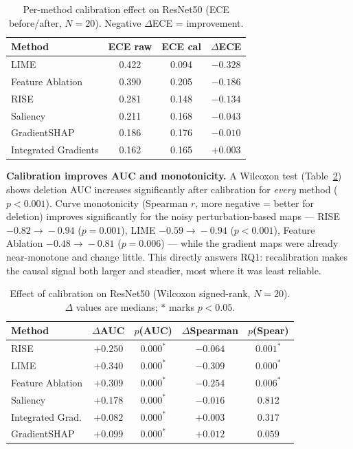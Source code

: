 \documentclass[11pt]{article}
\begin{document}
\begin{table}[H]
\centering\small
\caption{Per-method calibration effect on ResNet50 (ECE before/after,
$N{=}20$). Negative $\Delta$ECE = improvement.}
\label{tab:percal}
\begin{tabular}{lccc}
\toprule
Method & ECE raw & ECE cal & $\Delta$ECE \\
\midrule
LIME                 & 0.422 & 0.094 & $-0.328$ \\
Feature Ablation     & 0.390 & 0.205 & $-0.186$ \\
RISE                 & 0.281 & 0.148 & $-0.134$ \\
Saliency             & 0.211 & 0.168 & $-0.043$ \\
GradientSHAP         & 0.186 & 0.176 & $-0.010$ \\
Integrated Gradients & 0.162 & 0.165 & $+0.003$ \\
\bottomrule
\end{tabular}
\end{table}


\textbf{Calibration improves AUC and monotonicity.} A Wilcoxon test
(Table~\ref{tab:wilcoxon}) shows deletion AUC increases significantly after
calibration for \emph{every} method ($p<0.001$). Curve monotonicity (Spearman
$r$, more negative = better for deletion) improves significantly for the noisy
perturbation-based maps --- RISE $-0.82\!\to\!-0.94$ ($p{=}0.001$), LIME
$-0.59\!\to\!-0.94$ ($p<0.001$), Feature Ablation $-0.48\!\to\!-0.81$
($p{=}0.006$) --- while the gradient maps were already near-monotone and change
little. This directly answers RQ1: recalibration makes the causal signal both
larger and steadier, most where it was least reliable.

\begin{table}[H]
\centering\small
\caption{Effect of calibration on ResNet50 (Wilcoxon signed-rank, $N{=}20$).
$\Delta$ values are medians; $*$ marks $p<0.05$.}
\label{tab:wilcoxon}
\begin{tabular}{lcccc}
\toprule
Method & $\Delta$AUC & $p$(AUC) & $\Delta$Spearman & $p$(Spear) \\
\midrule
RISE             & $+0.250$ & $0.000^{*}$ & $-0.064$ & $0.001^{*}$ \\
LIME             & $+0.340$ & $0.000^{*}$ & $-0.309$ & $0.000^{*}$ \\
Feature Ablation & $+0.309$ & $0.000^{*}$ & $-0.254$ & $0.006^{*}$ \\
Saliency         & $+0.178$ & $0.000^{*}$ & $-0.016$ & $0.812$ \\
Integrated Grad. & $+0.082$ & $0.000^{*}$ & $+0.003$ & $0.317$ \\
GradientSHAP     & $+0.099$ & $0.000^{*}$ & $+0.012$ & $0.059$ \\
\bottomrule
\end{tabular}
\end{table}
\end{document}
